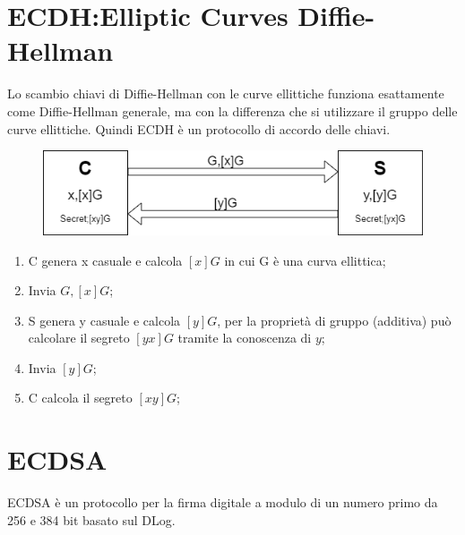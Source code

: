 \documentclass{book}
\begin{document}
\section{ECDH:Elliptic Curves Diffie-Hellman}
Lo scambio chiavi di Diffie-Hellman con le curve ellittiche funziona esattamente come Diffie-Hellman generale, ma con la differenza che si utilizzare il gruppo delle curve ellittiche. Quindi ECDH è un protocollo di accordo delle chiavi.
\vspace*{0.5cm}
\begin{figure}[ht]
	\centering
	\includegraphics[scale=0.7]{ECDH.png}
\end{figure}
\begin{enumerate}
	\item C genera x casuale e calcola \([x]G\) in cui G è una curva ellittica;
	\item Invia \(G,[x]G\);
	\item S genera y casuale e calcola \([y]G\), per la proprietà di gruppo (additiva) può calcolare il segreto \([yx]G\) tramite la conoscenza di \(y\);
	\item Invia \([y]G\);
	\item C calcola il segreto \([xy]G\);
\end{enumerate}
\section{ECDSA}
ECDSA è un protocollo per la firma digitale a modulo di un numero primo da 256 e 384 bit basato sul DLog.
\end{document}
